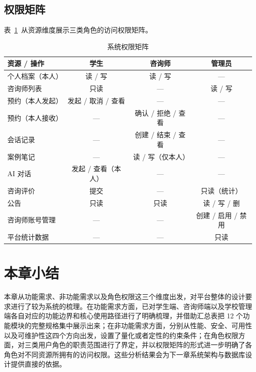 \subsection{权限矩阵}

表~\ref{tab:2-2}~从资源维度展示三类角色的访问权限矩阵。

\begin{table}[H]
    \centering
    \caption{系统权限矩阵}
    \label{tab:2-2}
    \begin{tabularx}{\linewidth}{Xccc}
        \toprule
        资源 / 操作 & 学生 & 咨询师 & 管理员 \\
        \midrule
        个人档案（本人） & 读 / 写 & 读 / 写 & — \\
        咨询师列表 & 只读 & — & 读 / 写 \\
        预约（本人发起） & 发起 / 取消 / 查看 & — & — \\
        预约（本人接收） & — & 确认 / 拒绝 / 查看 & — \\
        会话记录 & — & 创建 / 结束 / 查看 & — \\
        案例笔记 & — & 读 / 写（仅本人） & — \\
        AI 对话 & 发起 / 查看（本人） & — & — \\
        咨询评价 & 提交 & — & 只读（统计） \\
        公告 & 只读 & 只读 & 读 / 写 / 删 \\
        咨询师账号管理 & — & — & 创建 / 启用 / 禁用 \\
        平台统计数据 & — & — & 只读 \\
        \bottomrule
    \end{tabularx}
\end{table}


\section*{本章小结}

本章从功能需求、非功能需求以及角色权限这三个维度出发，对平台整体的设计要求进行了较为系统的梳理。在功能需求方面，已对学生端、咨询师端以及学校管理端各自对应的功能边界和核心使用路径进行了明确梳理，并借助汇总表把 12 个功能模块的完整规格集中展示出来；在非功能需求方面，分别从性能、安全、可用性以及可维护性这四个方向出发，设置了量化或者定性的约束条件；在角色权限方面，对三类用户角色的职责范围进行了界定，并以权限矩阵的形式进一步明确了各角色对不同资源所拥有的访问权限。这些分析结果会为下一章系统架构与数据库设计提供直接的依据。
